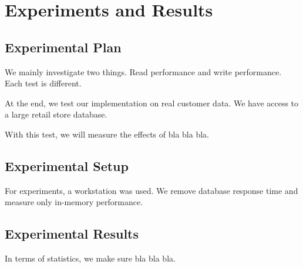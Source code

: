 \chapter{Experiments and Results}
\label{chap:Experiments and Results}

\section{Experimental Plan}
\label{sec:Experimental Plan}
We mainly investigate two things. Read performance and write performance. Each test is different.

At the end, we test our implementation on real customer data. We have access to a large retail store database.

With this test, we will measure the effects of bla bla bla.


\section{Experimental Setup}
\label{sec:Experimental Setup}
For experiments, a workstation was used. We remove database response time and measure only in-memory performance.


\section{Experimental Results}
\label{sec:Experimental Results}
In terms of statistics, we make sure bla bla bla.


